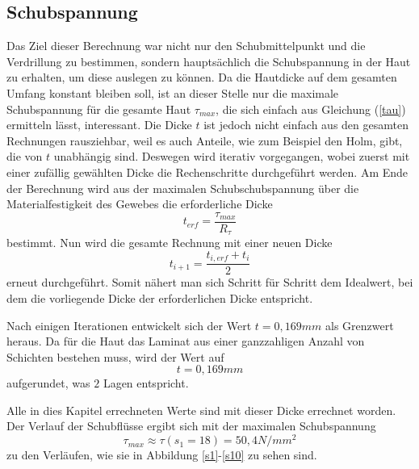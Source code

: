 \subsection{Schubspannung}
Das Ziel dieser Berechnung war nicht nur den Schubmittelpunkt und die Verdrillung zu bestimmen, sondern hauptsächlich die Schubspannung in der Haut zu erhalten, um diese auslegen zu können. Da die Hautdicke auf dem gesamten Umfang konstant bleiben soll, ist an dieser Stelle nur die maximale Schubspannung für die gesamte Haut $\tau_{max}$, die sich einfach aus Gleichung (\ref{tau}) ermitteln lässt, interessant. Die Dicke $t$ ist jedoch nicht einfach aus den gesamten Rechnungen rausziehbar, weil es auch Anteile, wie zum Beispiel den Holm, gibt, die von $t$ unabhängig sind. Deswegen wird iterativ vorgegangen, wobei zuerst mit einer zufällig gewählten Dicke die Rechenschritte durchgeführt werden. Am Ende der Berechnung wird aus der maximalen Schubschubspannung über die Materialfestigkeit des Gewebes die erforderliche Dicke \begin{equation}
	t_{erf} = \frac{\tau_{max}}{R_{\tau}}
\end{equation} bestimmt. Nun wird die gesamte Rechnung mit einer neuen Dicke
\begin{equation}
	t_{i+1} =\frac{t_{i,erf}+t_{i}}{2}
\end{equation}
erneut durchgeführt. Somit nähert man sich Schritt für Schritt dem Idealwert, bei dem die vorliegende Dicke der erforderlichen Dicke entspricht.

Nach einigen Iterationen entwickelt sich der Wert $t = 0,169 mm$ als Grenzwert heraus. Da für die Haut das Laminat aus einer ganzzahligen Anzahl von Schichten bestehen muss, wird der Wert auf 
\begin{equation}
	t = 0,169 mm
\end{equation}
aufgerundet, was $2$ Lagen entspricht.

Alle in dies Kapitel errechneten Werte sind mit dieser Dicke errechnet worden. Der Verlauf der Schubflüsse ergibt sich mit der maximalen Schubspannung
\begin{equation}
\tau_{max}\approx\tau(s_1=18)=50,4 N/mm^2
\end{equation}
zu den Verläufen, wie sie in Abbildung \ref{s1}-\ref{s10} zu sehen sind.








